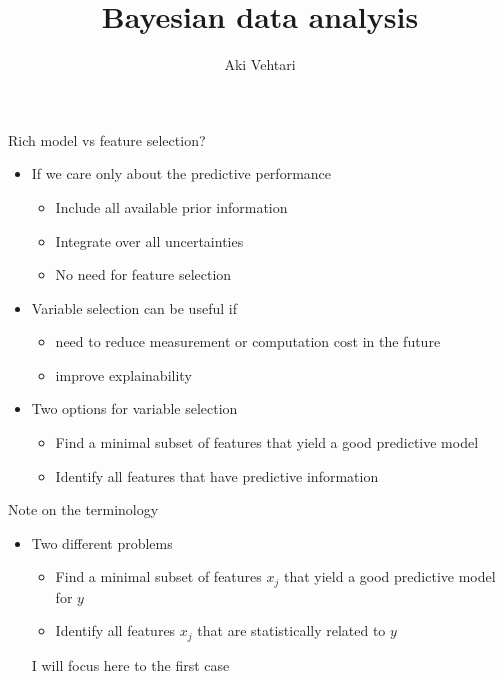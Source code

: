 \documentclass[english,t]{beamer}
\title[]{Bayesian data analysis}
\subtitle{}
\author{Aki Vehtari}
\institute[Aalto]{}
\date[]{}
\renewcommand{\emph}[1]{\textcolor{navyblue}{#1}}
\begin{document}
\begin{frame}{}

  {\Large\color{navyblue} Rich model vs feature selection?}

  \begin{itemize}
  \item If we care only about the predictive performance
    \begin{itemize}
    \item Include all available prior information
    \item Integrate over all uncertainties
    \item No need for feature selection
    \end{itemize}
  \item<2-> Variable selection can be useful if
    \begin{itemize}
    \item need to reduce measurement or computation cost in the future
    \item improve explainability
    \end{itemize}
  \item<3-> Two options for variable selection
    \begin{itemize}
    \item Find a minimal subset of features that yield a good
      predictive model
    \item Identify all features that have predictive information
    \end{itemize}
  \end{itemize}
  
\end{frame}

\begin{frame}{}

  {\Large\color{navyblue} Note on the terminology}
  
\begin{itemize}
\item Two different problems
  \begin{itemize}
  \item Find a \emph{minimal} subset of features $x_j$ that yield a good predictive model for $y$
  \item Identify \emph{all} features $x_j$ that are statistically related to $y$
  \end{itemize}\pause
  I will focus here to the first case
\end{itemize}

\end{frame}
\end{document}
